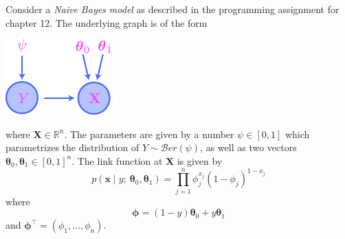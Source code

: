 \documentclass[12pt,reqno]{amsart}
\begin{document}
\bigskip

\prob Consider a \textit{Naive Bayes model} as described in the programming assignment for chapter 12. The underlying graph is of the form

\bigskip
\begin{center}
\includegraphics[scale=1.5]{nb}
\end{center}
\bigskip

where $\mathbf{X} \in \mathbb{R}^n$. The parameters are given by a number $\psi\in [0,1]$ which parametrizes the distribution of $Y\sim \mathcal{B}er(\psi)$, as well as two vectors $\boldsymbol{\theta}_0, \boldsymbol{\theta}_1 \in [0,1]^n$. The link function at $\mathbf{X}$ is given by
	\[
	p(\mathbf{x} \mid y ; \  \boldsymbol{\theta}_0, \boldsymbol{\theta}_1 ) = \prod_{j=1}^n \phi_j^{x_j}(1-\phi_j)^{1-x_j}
	\]
where
	\[
	\boldsymbol{\phi} = (1-y) \boldsymbol{\theta}_0 + y \boldsymbol{\theta}_1
	\]
and	$\boldsymbol{\phi}^\intercal = (\phi_1,\ldots,\phi_n)$.
\end{document}
